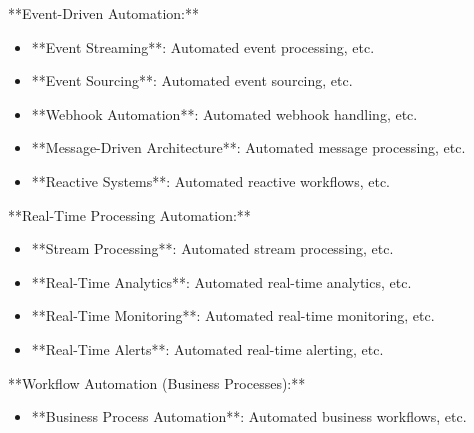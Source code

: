 \documentclass[11pt,a4paper]{article}
\begin{document}
**Event-Driven Automation:**

\begin{itemize}
\item **Event Streaming**: Automated event processing, etc.
\end{itemize}

\begin{itemize}
\item **Event Sourcing**: Automated event sourcing, etc.
\end{itemize}

\begin{itemize}
\item **Webhook Automation**: Automated webhook handling, etc.
\end{itemize}

\begin{itemize}
\item **Message-Driven Architecture**: Automated message processing, etc.
\end{itemize}

\begin{itemize}
\item **Reactive Systems**: Automated reactive workflows, etc.
\end{itemize}

**Real-Time Processing Automation:**

\begin{itemize}
\item **Stream Processing**: Automated stream processing, etc.
\end{itemize}

\begin{itemize}
\item **Real-Time Analytics**: Automated real-time analytics, etc.
\end{itemize}

\begin{itemize}
\item **Real-Time Monitoring**: Automated real-time monitoring, etc.
\end{itemize}

\begin{itemize}
\item **Real-Time Alerts**: Automated real-time alerting, etc.
\end{itemize}

**Workflow Automation (Business Processes):**

\begin{itemize}
\item **Business Process Automation**: Automated business workflows, etc.
\end{itemize}
\end{document}
